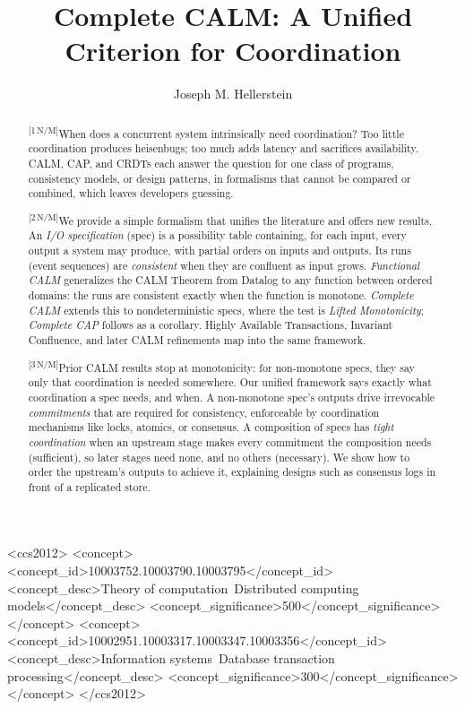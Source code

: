 \documentclass[sigconf]{cidr-2027}
\theoremstyle{remark}
\newcommand{\commitment}{commitment\xspace}
\newcommand{\commitments}{commitments\xspace}
\newcommand{\spectype}[1][]{I/O specification#1\xspace}
\newif\ifshowrv \showrvfalse
\newcommand{\rv}[1]{\ifshowrv\textsuperscript{\textcolor{magenta}{\textbf{R#1}}}\fi}
\newcommand{\cxtag}[2]{\textsuperscript{\textsf{\tiny[#1\,#2]}}}
\begin{document}
\title{Complete CALM: A Unified Criterion for Coordination}

\author{Joseph M. Hellerstein}

\color{black}\begin{abstract}
\cxtag{1}{N/M}When does a concurrent system intrinsically need coordination?  Too little
coordination produces heisenbugs; too much adds latency and sacrifices
availability.  CALM, CAP, and CRDTs each answer the question for one class of
programs, consistency models, or design patterns, in formalisms that cannot be
compared or combined, which leaves developers guessing.

\color{black}\cxtag{2}{N/M}We provide a simple formalism that unifies the literature and
offers new results.  An \emph{\spectype} (spec) is a possibility table containing, for
each input, every output a system may produce, with partial orders on inputs and
outputs.  Its runs (event sequences)\rv{7} are \emph{consistent} when they are confluent as input grows.
\emph{Functional CALM} generalizes the CALM Theorem from Datalog to any function
between ordered domains: the runs are consistent exactly when the function is
monotone.  \emph{Complete CALM}
extends this to nondeterministic specs, where the test is
\emph{Lifted Monotonicity}; \emph{Complete CAP} follows as a corollary.
Highly Available Transactions, Invariant Confluence, and later CALM refinements map into the same framework.

\color{black}\cxtag{3}{N/M}Prior CALM results stop at monotonicity: for non-monotone
specs, they say only that coordination is needed somewhere.  Our
unified framework says exactly
what coordination a spec needs, and when.  A non-monotone
spec's outputs drive irrevocable \emph{\commitments} that are required for consistency,
enforceable by coordination mechanisms like locks, atomics, or consensus.
A composition of specs has \emph{tight coordination} when an upstream stage makes every \commitment the composition needs (sufficient), so later stages need none, and no others (necessary).\rv{8}  We show how to order the upstream's outputs to achieve it, explaining designs such
as consensus logs in front of a replicated store.
\end{abstract}

\begin{CCSXML}
<ccs2012>
<concept>
<concept_id>10003752.10003790.10003795</concept_id>
<concept_desc>Theory of computation~Distributed computing models</concept_desc>
<concept_significance>500</concept_significance>
</concept>
<concept>
<concept_id>10002951.10003317.10003347.10003356</concept_id>
<concept_desc>Information systems~Database transaction processing</concept_desc>
<concept_significance>300</concept_significance>
</concept>
</ccs2012>
\end{CCSXML}
\end{document}
